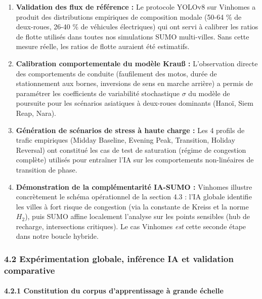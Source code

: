 \documentclass[10pt, a4paper]{article}
\begin{document}
\begin{enumerate}
\def\labelenumi{\arabic{enumi}.}
\item
  \textbf{Validation des flux de référence :} Le protocole YOLOv8 sur
  Vinhomes a produit des distributions empiriques de composition modale
  (50-64 \% de deux-roues, 26-40 \% de véhicules électriques) qui ont
  servi à calibrer les ratios de flotte utilisés dans toutes nos
  simulations SUMO multi-villes. Sans cette mesure réelle, les ratios de
  flotte auraient été estimatifs.
\item
  \textbf{Calibration comportementale du modèle Krauß :} L'observation
  directe des comportements de conduite (faufilement des motos, durée de
  stationnement aux bornes, inversions de sens en marche arrière) a
  permis de paramétrer les coefficients de variabilité stochastique
  \(\sigma\) du modèle de poursuite pour les scénarios asiatiques à
  deux-roues dominants (Hanoï, Siem Reap, Nara).
\item
  \textbf{Génération de scénarios de stress à haute charge :} Les 4
  profils de trafic empiriques (Midday Baseline, Evening Peak,
  Transition, Holiday Reversal) ont constitué les cas de test de
  saturation (régime de congestion complète) utilisés pour entraîner
  l'IA sur les comportements non-linéaires de transition de phase.
\item
  \textbf{Démonstration de la complémentarité IA-SUMO :} Vinhomes
  illustre concrètement le schéma opérationnel de la section 4.3 : l'IA
  globale identifie les villes à fort risque de congestion (via la
  constante de Kreiss et la norme \(H_2\)), puis SUMO affine localement
  l'analyse sur les points sensibles (hub de recharge, intersections
  critiques). Le cas Vinhomes \emph{est} cette seconde étape dans notre
  boucle hybride.
\end{enumerate}

\subsubsection{4.2 Expérimentation globale, inférence IA et validation
comparative}\label{expuxe9rimentation-globale-infuxe9rence-ia-et-validation-comparative}

\paragraph{4.2.1 Constitution du corpus d'apprentissage à grande
échelle}\label{constitution-du-corpus-dapprentissage-uxe0-grande-uxe9chelle}
\end{document}
